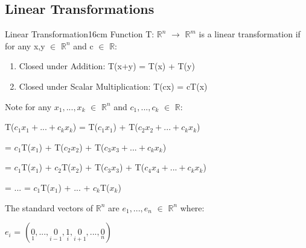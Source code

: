 \subsection{ Linear Transformations }

    \begin{definition}{Linear Transformation}{16cm}
        Function T: $\mathbb{R}^n$ $\rightarrow$ $\mathbb{R}^m$
        is a {\color{lblue} linear transformation}
        if for any x,y $\in$ $\mathbb{R}^n$ and c $\in$ $\mathbb{R}$:

        \begin{enumerate}[label=(\alph*), leftmargin=1cm, itemsep=0.1cm]
            \item {\color{lgreen} Closed under Addition}:
                T(x+y) = T(x) + T(y)

            \item {\color{lgreen} Closed under Scalar Multiplication}:
                T(cx) = cT(x)
        \end{enumerate}

        Note for any $x_1,...,x_k$ $\in$ $\mathbb{R}^n$
        and $c_1,...,c_k$ $\in$ $\mathbb{R}$:

        \hspace{0.5cm}
        T($c_1x_1 + ... + c_kx_k$)
        = T($c_1x_1$) + T($c_2x_2 + ... + c_kx_k$)

        \hspace{4.15cm}
        = $c_1$T($x_1$) + T($c_2x_2$) + T($c_3x_3 + ... + c_kx_k$)

        \hspace{4.15cm}
        = $c_1$T($x_1$) + $c_2$T($x_2$) + T($c_3x_3$) + T($c_4x_4 + ... + c_kx_k$)

        \hspace{4.15cm}
        = ... = $c_1$T($x_1$) + ... + $c_k$T($x_k$)

        The {\color{lblue} standard vectors} of $\mathbb{R}^n$
        are $e_1,...,e_n$ $\in$ $\mathbb{R}^n$ where:

        \hspace{0.5cm}
        $e_i$ = $(\underset{\scriptscriptstyle 1}{0},...,
                \underset{\scriptscriptstyle i-1}{0},
                \underset{\scriptscriptstyle i}{1},
                \underset{\scriptscriptstyle i+1}{0},...,
                \underset{\scriptscriptstyle n}{0})$
    \end{definition}

    \newpage



